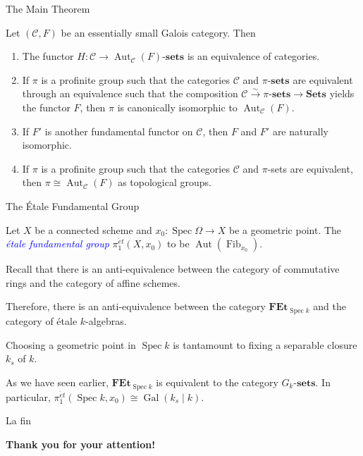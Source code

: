 \documentclass{beamer}
\newcommand{\catSets}{\mathbf{Sets}}
\newcommand{\sets}[1]{#1\text{-}\mathbf{sets}}
\newcommand{\Aut}{\operatorname{Aut}}
\newcommand{\Gal}{\operatorname{Gal}}
\newcommand{\Spec}{\operatorname{Spec}}
\newcommand{\scrC}{\mathscr{C}} %
\newcommand{\define}[1]{\textcolor{blue}{\textit{#1}}}
\begin{document}
\begin{frame}{The Main Theorem}
	\begin{theorem}
		Let $(\scrC, F)$ be an essentially small Galois category. Then 
		\begin{enumerate}
			\item The functor $H:\scrC\to\sets{\Aut_{\scrC}(F)}$ is an equivalence of categories. \pause 
			\item If $\pi$ is a profinite group such that the categories $\scrC$ and $\sets{\pi}$ are equivalent through an equivalence such that the composition $\scrC\xrightarrow{\sim}\sets{\pi}\to\catSets$ yields the functor $F$, then $\pi$ is canonically isomorphic to $\Aut_{\scrC}(F)$. \pause 
			\item If $F'$ is another fundamental functor on $\scrC$, then $F$ and $F'$ are naturally isomorphic. \pause 
			\item If $\pi$ is a profinite group such that the categories $\scrC$ and $\pi$-sets are equivalent, then $\pi\cong\Aut_{\scrC}(F)$ as topological groups. \pause 
		\end{enumerate}
	\end{theorem}
\end{frame}

\begin{frame}{The \'Etale Fundamental Group}
	\begin{definition}
		Let $X$ be a connected scheme and $x_0: \Spec\Omega\to X$ be a geometric point. The \define{\'etale fundamental group} $\pi_1^{\acute{e}t}(X, x_0)$ to be $\Aut(\operatorname{Fib}_{x_0})$.
	\end{definition}

	Recall that there is an anti-equivalence between the category of commutative rings and the category of affine schemes. 

	Therefore, there is an anti-equivalence between the category $\mathbf{FEt}_{\Spec k}$ and the category of \'etale $k$-algebras.

	Choosing a geometric point in $\Spec k$ is tantamount to fixing a separable closure $k_s$ of $k$.

	As we have seen earlier, $\mathbf{FEt}_{\Spec k}$ is equivalent to the category $\sets{G_k}$. 
	In particular, $\pi_1^{\acute{e}t}(\Spec k, x_0)\cong\Gal(k_s\mid k)$.
\end{frame}

\begin{frame}{La fin}
	\Large 
	\begin{center}
		\textbf{Thank you for your attention!}
	\end{center}
\end{frame}
\end{document}

